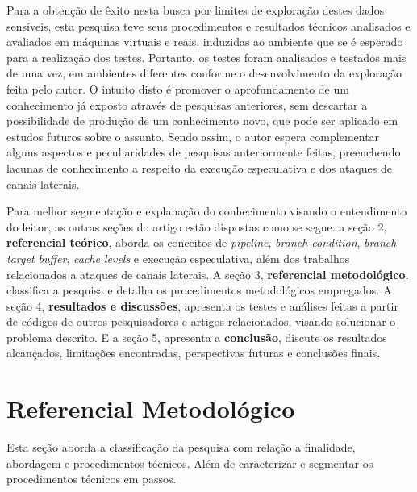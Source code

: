 \documentclass[
	article,			    %
	12pt,				    %
	oneside,			    %
	a4paper,			    %
	chapter=TITLE,		    %
	section=TITLE,		    %
	subsection=TITLE,	    %
	english,			    %
	brazil,				    %
	sumario=tradicional
]{abntex2}
\begin{document}

Para a obtenção de êxito nesta busca por limites de exploração destes dados sensíveis, esta pesquisa teve seus procedimentos e resultados técnicos analisados e avaliados em máquinas virtuais e reais, induzidas ao ambiente que se é esperado para a realização dos testes. Portanto, os testes foram analisados e testados mais de uma vez, em ambientes diferentes conforme o desenvolvimento da exploração feita pelo autor. O intuito disto é promover o aprofundamento de um conhecimento já exposto através de pesquisas anteriores, sem descartar a possibilidade de produção de um conhecimento novo, que pode ser aplicado em estudos futuros sobre o assunto. Sendo assim, o autor espera complementar alguns aspectos e peculiaridades de pesquisas anteriormente feitas, preenchendo lacunas de conhecimento a respeito da execução especulativa e dos ataques de canais laterais.

Para melhor segmentação e explanação do conhecimento visando o entendimento do leitor, as outras seções do artigo estão dispostas como se segue: a seção 2, \textbf{referencial teórico}, aborda os conceitos de \emph{pipeline}, \emph{branch condition}, \emph{branch target buffer}, \emph{cache levels} e execução especulativa, além dos trabalhos relacionados a ataques de canais laterais. A seção 3, \textbf{referencial metodológico}, classifica a pesquisa e detalha os procedimentos metodológicos empregados. A seção 4, \textbf{resultados e discussões}, apresenta os testes e análises feitas a partir de códigos de outros pesquisadores e artigos relacionados, visando solucionar o problema descrito. E a seção 5, apresenta a \textbf{conclusão}, discute os resultados alcançados, limitações encontradas, perspectivas futuras e conclusões finais.

\section{Referencial Metodológico}
Esta seção aborda a classificação da pesquisa com relação a finalidade, abordagem e procedimentos técnicos. Além de caracterizar e segmentar os procedimentos técnicos em passos.
\end{document}
